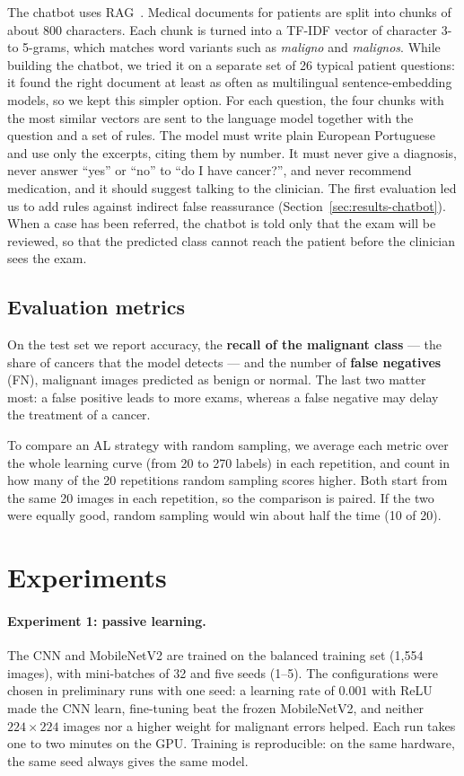 \documentclass{article}
\begin{document}
The chatbot uses RAG~\cite{lewis2020rag}. Medical documents for patients are split into
chunks of about 800 characters. Each chunk is turned into a TF-IDF vector of character
3- to 5-grams, which matches word variants such as \emph{maligno} and \emph{malignos}. While building
the chatbot, we tried it on a separate set of 26 typical patient questions: it found the right
document at least as often as multilingual sentence-embedding models, so we kept this simpler
option. For each question, the four chunks with
the most similar vectors are sent to the language model together with the question and a set of
rules. The model must write plain European Portuguese and use only the excerpts, citing them
by number. It must never give a diagnosis, never answer ``yes'' or ``no'' to ``do I have
cancer?'', and never recommend medication, and it should suggest talking to the clinician.
The first evaluation led us to add rules against indirect false reassurance
(Section~\ref{sec:results-chatbot}).
When a case has been referred, the chatbot is told only that the exam will be reviewed, so
that the predicted class cannot reach the patient before the clinician sees the exam.

\subsection{Evaluation metrics}
On the test set we report accuracy, the \textbf{recall of the malignant class} --- the share
of cancers that the model detects --- and the number of \textbf{false negatives} (FN),
malignant images predicted as benign or normal. The last two matter most: a false positive
leads to more exams, whereas a false negative may delay the treatment of a cancer.

To compare an AL strategy with random sampling, we average each metric over the whole
learning curve (from 20 to 270 labels) in each repetition, and count in how many of the 20
repetitions random sampling scores higher. Both start from the same 20 images in each
repetition, so the comparison is paired. If the two were equally good, random sampling would
win about half the time (10 of 20).

\section{Experiments}
\label{sec:experiments}

\paragraph{Experiment 1: passive learning.} The CNN and MobileNetV2 are trained on the
balanced training set (1{,}554 images), with mini-batches of 32 and five seeds (1--5). The
configurations were chosen in preliminary runs with one seed: a learning rate of $0.001$
with ReLU made the CNN learn, fine-tuning beat the frozen MobileNetV2, and neither
$224\times224$ images nor a higher weight for malignant errors helped. Each
run takes one to two minutes on the GPU. Training is reproducible: on the same hardware,
the same seed always gives the same model.
\end{document}
